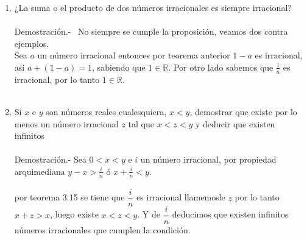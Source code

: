 \begin{enumerate}
\item ¿La suma o el producto de dos números irracionales es siempre irracional?\\\\
Demostración.- \, No siempre se cumple la proposición, veamos dos contra ejemplos.\\
Sea $a$ un número irracional entonces por teorema anterior $1-a$ es irracional, así $a+(1-a)=1$, sabiendo que $1\in \mathbb{R}$. Por otro lado sabemos que $\displaystyle\frac{1}{a}$ es irracional, por lo tanto $1\in \mathbb{R}$.\\\\

\item Si $x$ e $y$ son números reales cualesquiera, $x<y$, demostrar que existe por lo menos un número irracional $z$ tal que $x<z<y$ y deducir que existen infinitos\\\\
Demostración.- \; Sea $0<x<y$ e $i$ un número irracional, por propiedad arquimediana  $y-x>\displaystyle\frac{i}{n}$ \; ó \; $\displaystyle x+ \frac{i}{n}<y$. \\\\
por teorema 3.15 \; se tiene que $\dfrac{i}{n}$ es irracional llamemosle $z$ por lo tanto  $x+z>x$, luego existe $x<z<y$. Y de $\dfrac{i}{n}$  deducimos que existen infinitos números irracionales que cumplen la condición.\\\\


\end{enumerate}
